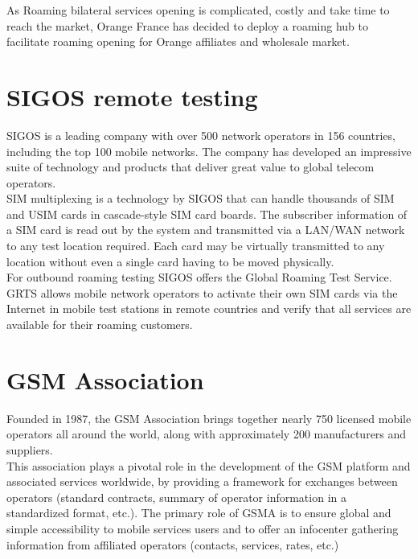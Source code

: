 As Roaming bilateral services opening is complicated, costly and take time to reach the market, Orange France has decided to deploy a roaming hub to facilitate roaming opening for Orange affiliates and wholesale market. \cite{roaming-hub} \\

\section{SIGOS remote testing}
\-\hspace{0.5cm} SIGOS is a leading company with over 500 network operators in 156 countries, including the top 100 mobile networks. The company has developed an impressive suite of technology and products that deliver great value to global telecom operators.\\

\acs{SIM} multiplexing is a technology by SIGOS that can handle thousands of \acs{SIM} and \acs{USIM} cards in cascade-style \acs{SIM} card boards. The subscriber information of a \acs{SIM} card is read out by the system and transmitted via a \acs{LAN}/\acs{WAN} network to any test location required. Each card may be virtually transmitted to any location without even a single card having to be moved physically.\\

For outbound roaming testing SIGOS offers the Global Roaming Test Service. \acs{GRTS} allows mobile network operators to activate their own \acs{SIM} cards via the Internet in mobile test stations in remote countries and verify that all services are available for their roaming customers. \cite{sigos} \\ 

\section{\acs{GSM} Association}   

\-\hspace{0.5cm} Founded in 1987, the \acs{GSM} Association brings together nearly 750 licensed mobile operators all around the world, along with approximately 200 manufacturers and suppliers.\\

This association plays a pivotal role in the development of the \acs{GSM} platform and associated services worldwide, by providing a framework for exchanges between operators (standard contracts, summary of operator information in a standardized format, etc.). The primary role of \acs{GSMA} is to ensure global and simple accessibility to mobile services users and to offer an infocenter gathering information from affiliated operators (contacts, services, rates, etc.) \cite{gsma} \\

